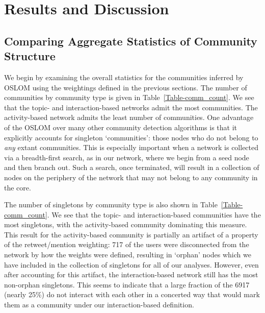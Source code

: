 \section{Results and Discussion}

\subsection{Comparing Aggregate Statistics of Community Structure}

We begin by examining the overall statistics for the communities inferred by OSLOM using the weightings defined in the previous sections. The number of communities by community type is given in Table~\ref{Table-comm_count}. We see that the topic- and interaction-based networks admit the most communities. The activity-based network admits the least number of communities.  One advantage of the OSLOM over many other community detection algorithms is that it explicitly accounts for singleton `communities': those nodes who do not belong to \emph{any} extant communities. This is especially important when a network is collected via a breadth-first search, as in our network, where we begin from a seed node and then branch out. Such a search, once terminated, will result in a collection of nodes on the periphery of the network that may not belong to any community in the core.


The number of singletons by community type is also shown in Table~\ref{Table-comm_count}. We see that the topic- and interaction-based communities have the most singletons, with the activity-based community dominating this measure. This result for the activity-based community is partially an artifact of a property of the retweet/mention weighting: 717 of the users were disconnected from the network by how the weights were defined, resulting in `orphan' nodes which we have included in the collection of singletons for all of our analyses. However, even after accounting for this artifact, the interaction-based network still has the most non-orphan singletons. This seems to indicate that a large fraction of the 6917 (nearly 25\%) do not interact with each other in a concerted way that would mark them as a community under our interaction-based definition.

